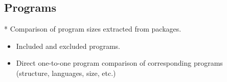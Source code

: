 \subsection{Programs}\label{Programs}

* Comparison of program sizes extracted from packages.

\begin{itemize}
    \item Included and excluded programs.
    \item Direct one-to-one program comparison of corresponding programs \\(structure, languages, size, etc.)
\end{itemize}
